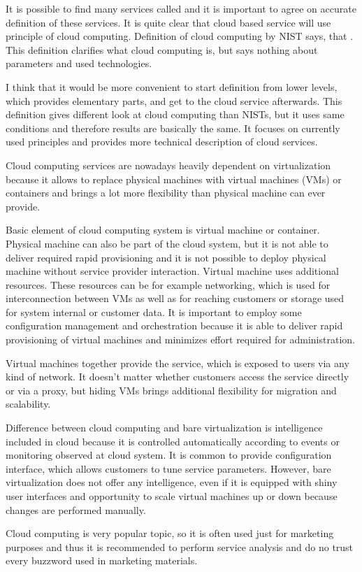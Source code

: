 
It is possible to find many services called  and it is important to agree on accurate definition of these services. It is quite clear that cloud based service will use principle of cloud computing. Definition of cloud computing by \Ac{NIST} says, that  \cite{cloud-definition}. This definition clarifies what cloud computing is, but says nothing about parameters and used technologies.

I think that it would be more convenient to start definition from lower levels, which provides elementary parts, and get to the cloud service afterwards. This definition gives different look at cloud computing than \Ac{NIST}s, but it uses same conditions and therefore results are basically the same. It focuses on currently used principles and provides more technical description of cloud services.

Cloud computing services are nowadays heavily dependent on virtualization because it allows to replace physical machines with virtual machines (\Ac{VM}s) or containers and brings a lot more flexibility than physical machine can ever provide.

Basic element of cloud computing system is virtual machine or container. Physical machine can also be part of the cloud system, but it is not able to deliver required rapid provisioning and it is not possible to deploy physical machine without service provider interaction. Virtual machine uses additional resources. These resources can be for example networking, which is used for interconnection between \Ac{VM}s as well as for reaching customers or storage used for system internal or customer data. It is important to employ some configuration management and orchestration because it is able to deliver rapid provisioning of virtual machines and minimizes effort required for administration.

Virtual machines together provide the service, which is exposed to users via any kind of network. It doesn't matter whether customers access the service directly or via a proxy, but hiding \Ac{VM}s brings additional flexibility for migration and scalability. 

Difference between cloud computing and bare virtualization is intelligence included in cloud because it is controlled automatically according to events or monitoring observed at cloud system. It is common to provide configuration interface, which allows customers to tune service parameters.
However, bare virtualization does not offer any intelligence, even if it is equipped with shiny user interfaces and opportunity to scale virtual machines up or down because changes are performed manually.

Cloud computing is very popular topic, so it is often used just for marketing purposes and thus it is recommended to perform service analysis and do no trust every buzzword used in marketing materials.
